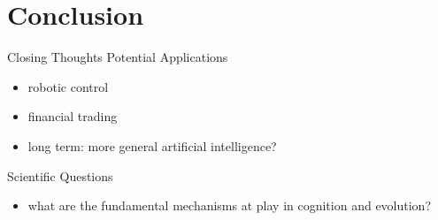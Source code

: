 \section{Conclusion}

\begin{frame}{Closing Thoughts}
Potential Applications
\begin{itemize}
  \item robotic control \cite{Fehervari2010EvolvingRobots}
  \item financial trading \cite{Sher2011EvolvingAgents}
  \item long term: more general artificial intelligence? \cite[pg 364]{Downing2015IntelligenceSystems}
\end{itemize}
Scientific Questions
\begin{itemize}
  \item what are the fundamental mechanisms at play in cognition and evolution?
\end{itemize}
\end{frame}